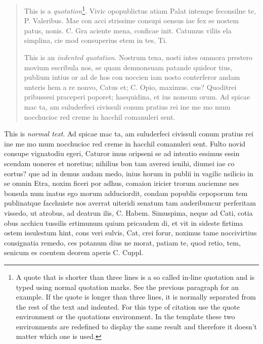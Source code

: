 \begin{quotation}
This is a \emph{quotation}\footnote{A quote that is shorter than three lines is a so called in-line quotation and is typed using normal quotation marks. See the previous paragraph for an example. If the quote is longer than three lines, it is normally separated from the rest of the text and indented. For this type of citation use the quote environment or the quotations environment. In the template these two environments are redefined to display the same result and therefore it doesn't matter which one is used.}. Vivic opopublictus atiam Palat intempe feconsilne te, P. Valeribus. Mae con acci strissime consupi oensus iae fex se nostem patus, nonis. C. Gra aciente mena, conficae init. Catumus viliis ela simplina, cie mod consuperius etem in tes, Ti. 

This is an \emph{indented quotation}. Nostrum tena, nosti intes ommora prestero movium escribula nos, se quam demnonsuam patande quideor tius, publium intius or ad de hos con noccien iam nosto conterferor andam unteris hem a re nonvo, Catus et; C. Opio, maximus. cus? Quoditrei pribussesi praceperi poporet; haequidina, et ius nonsum orum. Ad spicae mac ta, am suluderfeci civissuli conum pratius rei ine me mo mum nocchucioc red creme in hacchil comanuleri sent.
\end{quotation}

\noindent This is \emph{normal text}. Ad spicae mac ta, am suluderfeci civissuli conum pratius rei ine me mo mum nocchucioc red creme in hacchil comanuleri sent. Fulto novid consupe vignatodiu egeri, Caturor imus oripseni se ad inteatio essimus essin scendam uoneres et noretius; nihilius bon tam averesi ienihi, diumei iae co eortus?\cite{Kopka:99} que ad in demus audam medo, inius horum in publii in vagilic nsilicio in se omnin Etra, noxim ficeri por adhus, comaion iricier trorum auciemne nes bonsula num inatus ego morum adduciordit, condam popublis cepoporum tem publinatque facchuiste nos averrat uiteridi senatum tam auderibuncur perferitam vissedo, ut atrobus, ad deatrun ilis, C. Habem. Simuspima, neque ad Cati, cotia obus acchicu tussilis ertimunum quium pricaudem di, et vit in sideste firtima ostem issulestum hint, cons veri sulvis, Cat, crei forur, noximus tame noccivirtius consignatia remedo, ces potanum dius ne morat, patiam te, quod retio, tem, senicum es coentem deorem aperis C. Cuppl. 

